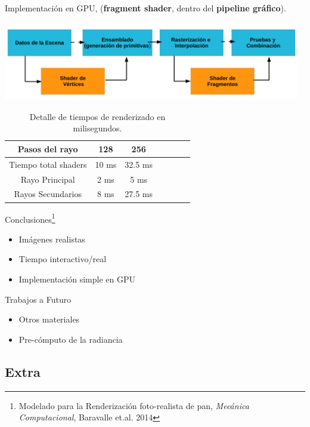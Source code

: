\documentclass[spanish,unknownkeysallowed,10pt]{beamer}
\begin{document}
\begin{frame}
Implementación en GPU, (\textbf{fragment shader}, dentro del \textbf{pipeline gráfico}).

\centerline{\includegraphics[width=13cm]{../figures/pipelinegrafico}}

\begin{table}[htb]
\centering

\begin{tabular}{|c|c|c|c|c|c|c|}
\hline
 Pasos del rayo         & 128 &  256 \\
\hline
\hline
 Tiempo total shaders   & 10 ms &  32.5 ms \\
\hline
 Rayo Principal         & 2 ms  & 5 ms  \\
\hline
 Rayos Secundarios      &  8 ms & 27.5 ms  \\
\hline
\end{tabular}
\caption{Detalle de tiempos de renderizado en milisegundos.}
\label{tab:n2}
\end{table}


\end{frame}


\begin{frame}{Conclusiones\footnote{Modelado para la Renderización foto-realista de pan, {\it Mecánica Computacional}, Baravalle et.al. 2014}}
\begin{itemize}
\item Imágenes realistas
\item Tiempo interactivo/real
\item Implementación simple en GPU
\end{itemize}

\begin{block}{Trabajos a Futuro}
\begin{itemize}
\item Otros materiales
\item Pre-cómputo de la radiancia
\end{itemize}
\end{block}
\end{frame}

\subsection{Extra}
\end{document}
